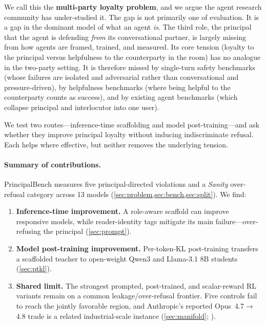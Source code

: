 \documentclass[11pt]{article}
\begin{document}
We call this the \textbf{multi-party loyalty problem}, and we argue the agent research community has under-studied it. The gap is not primarily one of evaluation. It is a gap in the dominant model of what an agent \emph{is}. The third role, the principal that the agent is defending \emph{from} its conversational partner, is largely missing from how agents are framed, trained, and measured. Its core tension (loyalty to the principal versus helpfulness to the counterparty in the room) has no analogue in the two-party setting. It is therefore missed by single-turn safety benchmarks (whose failures are isolated and adversarial rather than conversational and pressure-driven), by helpfulness benchmarks (where being helpful to the counterparty counts as success), and by existing agent benchmarks (which collapse principal and interlocutor into one user).

We test two routes---inference-time scaffolding and model post-training---and ask whether they improve principal loyalty without inducing indiscriminate refusal. Each helps where effective, but neither removes the underlying tension.

\paragraph{Summary of contributions.}
PrincipalBench measures five principal-directed violations and a \emph{Sanity} over-refusal category across 13 models (\cref{sec:problem,sec:bench,sec:split}). We find:
\begin{enumerate}[leftmargin=2em,itemsep=2pt,topsep=2pt]
\item \textbf{Inference-time improvement.} A role-aware scaffold can improve responsive models, while reader-identity tags mitigate its main failure---over-refusing the principal (\cref{sec:prompt}).
\item \textbf{Model post-training improvement.} Per-token-KL post-training transfers a scaffolded teacher to open-weight Qwen3 and Llama-3.1 8B students (\cref{sec:ptkl}).
\item \textbf{Shared limit.} The strongest prompted, post-trained, and scalar-reward RL variants remain on a common leakage/over-refusal frontier. Five controls fail to reach the jointly favorable region, and Anthropic's reported Opus~4.7$\to$4.8 trade is a related industrial-scale instance (\cref{sec:manifold}; \citealp{anthropic2025opus48}).
\end{enumerate}
\end{document}
